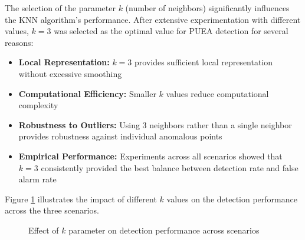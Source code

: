 The selection of the parameter $k$ (number of neighbors) significantly influences the KNN algorithm's performance. After extensive experimentation with different values, $k=3$ was selected as the optimal value for PUEA detection for several reasons:

\begin{itemize}
    \item \textbf{Local Representation:} $k=3$ provides sufficient local representation without excessive smoothing
    \item \textbf{Computational Efficiency:} Smaller $k$ values reduce computational complexity
    \item \textbf{Robustness to Outliers:} Using 3 neighbors rather than a single neighbor provides robustness against individual anomalous points
    \item \textbf{Empirical Performance:} Experiments across all scenarios showed that $k=3$ consistently provided the best balance between detection rate and false alarm rate
\end{itemize}

Figure \ref{fig:knn_parameter} illustrates the impact of different $k$ values on the detection performance across the three scenarios.

\begin{figure}[htbp]
    \centering
    \caption{Effect of $k$ parameter on detection performance across scenarios}
    \label{fig:knn_parameter}
\end{figure}

